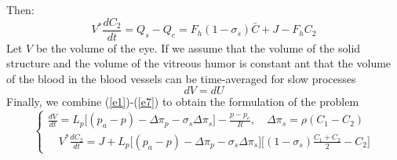 \documentclass[english,12pt]{article}
\begin{document}
Then:
\begin{equation}
V^{\ast} \frac{dC_{2}}{dt}= Q_s-Q_e=F_h (1-\sigma_s) \bar{C}+J-F_h C_2
\label{e6}
\end{equation}
Let $V$ be the volume of the eye. If we assume that the volume of the solid structure and the volume of the vitreous humor is constant ant that the volume of the blood in the blood vessels can be time-averaged for slow processes
\begin{equation}
dV = dU
\label{e7}
\end{equation}
Finally, we combine (\ref{e1})-(\ref{e7}) to obtain the formulation of the problem
\begin{equation}\label{e8}
\left\{\begin{array}{ll}
\displaystyle{\frac{dV}{dt}}= L_p \big[ (p_a-p)-\Delta\pi_{p}-\sigma_{s} \Delta\pi_{s}\big]-\frac{p-p_{e}}{R},\quad \Delta\pi_{s}=\rho(C_1-C_{2})\\
\quad V^{\ast} \displaystyle{\frac{dC_{2}}{dt}}=J+L_p\big[(p_a-p)- \Delta\pi_{p}-\sigma_{s} \Delta\pi_{s}\big] \big[(1-\sigma_s)\displaystyle{\frac{C_1+C_2}{2}-C_2\big]}
\end{array}\right.
\end{equation}
\end{document}
